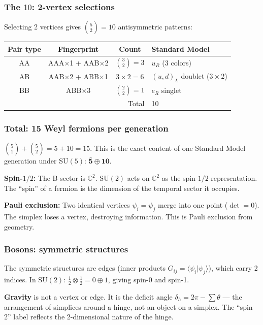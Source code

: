 \documentclass[12pt]{article}
\theoremstyle{remark}
\theoremstyle{definition}
\newcommand{\CC}{\mathbb{C}}
\begin{document}
\subsubsection{The $10$: 2-vertex selections}

Selecting 2 vertices gives $\binom{5}{2} = 10$ antisymmetric patterns:

\begin{center}
\begin{tabular}{cccl}
\hline
Pair type & Fingerprint & Count & Standard Model \\
\hline
AA & AAA$\times$1 + AAB$\times$2 & $\binom{3}{2} = 3$ & $u_R$ (3 colors) \\
AB & AAB$\times$2 + ABB$\times$1 & $3 \times 2 = 6$ & $(u, d)_L$ doublet ($3 \times 2$) \\
BB & ABB$\times$3 & $\binom{2}{2} = 1$ & $e_R$ singlet \\
\hline
\multicolumn{3}{r}{Total} & 10 \\
\hline
\end{tabular}
\end{center}

\subsubsection{Total: 15 Weyl fermions per generation}

$\binom{5}{1} + \binom{5}{2} = 5 + 10 = 15$. This is the exact content of one Standard Model generation under $\text{SU}(5)$: $\bar{\mathbf{5}} \oplus \mathbf{10}$.

\textbf{Spin-$1/2$:} The B-sector is $\CC^2$. $\text{SU}(2)$ acts on $\CC^2$ as the spin-$1/2$ representation. The ``spin'' of a fermion is the dimension of the temporal sector it occupies.

\textbf{Pauli exclusion:} Two identical vertices $\psi_i = \psi_j$ merge into one point ($\det = 0$). The simplex loses a vertex, destroying information. This is Pauli exclusion from geometry.

\subsubsection{Bosons: symmetric structures}

The symmetric structures are edges (inner products $G_{ij} = \langle\psi_i|\psi_j\rangle$), which carry 2 indices. In $\text{SU}(2)$: $\frac{1}{2} \otimes \frac{1}{2} = 0 \oplus 1$, giving spin-0 and spin-1.

\textbf{Gravity} is not a vertex or edge. It is the deficit angle $\delta_h = 2\pi - \sum\theta$ --- the arrangement of simplices around a hinge, not an object on a simplex. The ``spin 2'' label reflects the 2-dimensional nature of the hinge.
\end{document}
